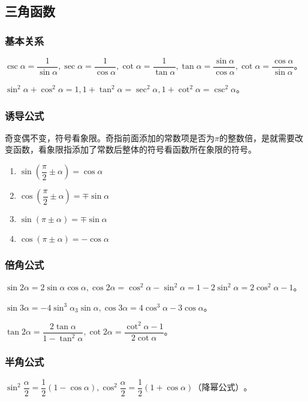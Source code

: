\documentclass[UTF8, 12pt]{ctexart}
\begin{document}
\subsection{三角函数}

\subsubsection{基本关系}

$\csc\alpha=\dfrac{1}{\sin\alpha},\sec\alpha=\dfrac{1}{\cos\alpha},\cot\alpha=\dfrac{1}{\tan\alpha},\tan\alpha=\dfrac{\sin\alpha}{\cos\alpha},\cot\alpha=\dfrac{\cos\alpha}{\sin\alpha}$。

$\sin^2\alpha+\cos^2\alpha=1,1+\tan^2\alpha=\sec^2\alpha,1+\cot^2\alpha=\csc^2\alpha$。

\subsubsection{诱导公式}

奇变偶不变，符号看象限。奇指前面添加的常数项是否为$\pi$的整数倍，是就需要改变函数，看象限指添加了常数后整体的符号看函数所在象限的符号。

\begin{enumerate}
    \item $\sin(\dfrac{\pi}{2}\pm\alpha)=\cos\alpha$
    \item $\cos(\dfrac{\pi}{2}\pm\alpha)=\mp\sin\alpha$
    \item $\sin(\pi\pm\alpha)=\mp\sin\alpha$
    \item $\cos(\pi\pm\alpha)=-\cos\alpha$
\end{enumerate}

\subsubsection{倍角公式}

$\sin 2\alpha=2\sin\alpha\cos\alpha,\cos 2\alpha=\cos^2\alpha-\sin^2\alpha=1-2\sin^2\alpha=2\cos^2\alpha-1$。

$\sin 3\alpha=-4\sin^3\alpha_3\sin\alpha,\cos 3\alpha=4\cos^3\alpha-3\cos\alpha$。

$\tan 2\alpha=\dfrac{2\tan\alpha}{1-\tan^2\alpha},\cot 2\alpha=\dfrac{\cot^2\alpha-1}{2\cot\alpha}$。

\subsubsection{半角公式}

$\sin^2\dfrac{\alpha}{2}=\dfrac{1}{2}(1-\cos\alpha),\cos^2\dfrac{\alpha}{2}=\dfrac{1}{2}(1+\cos\alpha)\text{（降幂公式）}$。
\end{document}
